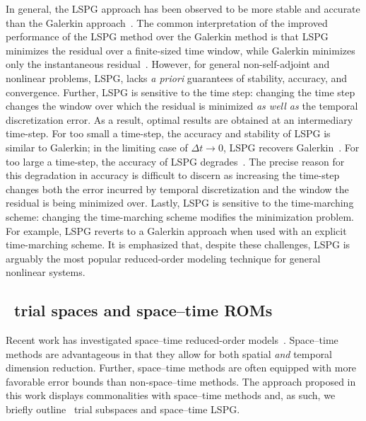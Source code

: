 \documentclass[3p,computermodern,10pt]{elsarticle}
\begin{document}
In general, the LSPG approach has been observed to be more stable and accurate than the 
Galerkin approach~\cite{carlberg_lspg_v_galerkin,carlberg_thesis,carlberg_gnat}. The common interpretation of the improved performance of the LSPG method over the Galerkin method is that LSPG minimizes the residual over a finite-sized time window, while Galerkin minimizes only the instantaneous residual~\cite{carlberg_lspg_v_galerkin}.  
However, for general non-self-adjoint and nonlinear problems, LSPG, lacks \textit{a priori} guarantees of stability, accuracy, and convergence. Further, 
LSPG is sensitive to the time step: changing the time step changes the window over which the residual is minimized 
\textit{as well as} the temporal discretization error. As a result, optimal results are obtained at an intermediary time-step. 
For too small a time-step, the accuracy and stability of LSPG is similar to Galerkin; in the 
limiting case of $\Delta t \rightarrow 0$, LSPG recovers Galerkin~\cite{carlberg_lspg_v_galerkin}. 
For too large a time-step, the accuracy of LSPG degrades~\cite{carlberg_lspg_v_galerkin,parish_apg}. The 
precise reason for this degradation in accuracy is difficult to discern as increasing the time-step changes both the error incurred by 
temporal discretization and the window the residual is being minimized over. Lastly, LSPG is sensitive to the time-marching scheme: changing the 
time-marching scheme modifies the minimization problem. For example, LSPG reverts to a Galerkin approach 
when used with an explicit time-marching scheme. It is emphasized that, despite these challenges, 
LSPG is arguably the most popular reduced-order modeling technique for general nonlinear systems.

\subsection{\spaceTimeAcronym\ trial spaces and space--time ROMs}
Recent work has investigated space--time reduced-order models~\cite{choi_stlspg,constantine_strom,URBAN2012203,Yano2014ASC,benner_st,bui_thesis}. Space--time methods 
are advantageous in that they allow for both spatial \textit{and} temporal dimension reduction. Further, space--time 
methods are often equipped with more favorable error bounds than non-space--time methods. The approach proposed in this work displays commonalities 
with space--time methods and, as such, we briefly outline \spaceTimeAcronym\ trial subspaces and space--time LSPG.
\end{document}
